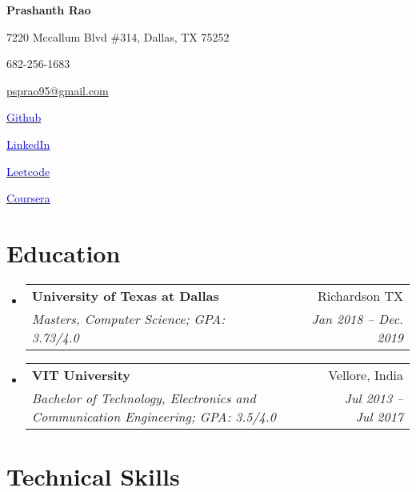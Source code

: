 \documentclass[letterpaper,11pt]{article}
\makeatletter
\newcommand{\resumeSubheading}[4]{
  \vspace{-1pt}\item
    \begin{tabular*}{0.97\textwidth}{l@{\extracolsep{\fill}}r}
      \textbf{#1} & #2 \\
      \textit{\small#3} & \textit{\small #4} \\
    \end{tabular*}\vspace{-5pt}
}
\newcommand{\resumeSubHeadingListStart}{\begin{itemize}[leftmargin=*]}
\newcommand{\resumeSubHeadingListEnd}{\end{itemize}}
\makeatother
\begin{document}
\begin{center}
  \textbf{\Huge Prashanth Rao}\\
  \vspace{0.05in}


    
    
    \begin{itemize*}
    \item7220 Mccallum Blvd \#314, Dallas, TX 75252
    \hspace{4in}
     \item  682-256-1683
     \hspace{1in}
     \item \href{mailto:psprao95@gmail.com}{psprao95@gmail.com}
    \end{itemize*}


  
  \begin{itemize*}
    \item   \href{https://www.github.com/psprao95}{\textcolor{blue}{Github}}
     \item   \href{https://www.linkedin.com/in/psprao}{\textcolor{blue}{LinkedIn}}
       \item   \href{https://www.leetcode.com/psprao95}{\textcolor{blue}{Leetcode}}
     \item   \href{https://www.coursera.org/user/b5584c6ff8b829314e6ea4476945ee82}{\textcolor{blue}{Coursera}}
    \hspace{8in}
  
  
  \end{itemize*}
\end{center}

\section{Education}
  \resumeSubHeadingListStart
    \resumeSubheading
      {University of Texas at Dallas}{Richardson TX}
      {Masters, Computer Science;  GPA: 3.73/4.0}{Jan 2018 -- Dec. 2019}
    \resumeSubheading
      {VIT University}{Vellore, India}
      {Bachelor of Technology, Electronics and Communication Engineering;  GPA: 3.5/4.0}{Jul 2013 -- Jul 2017}
  \resumeSubHeadingListEnd



\section{Technical Skills}
\end{document}
